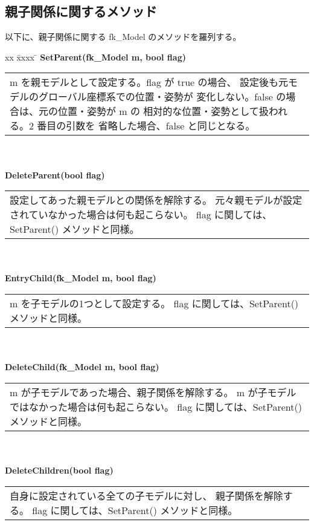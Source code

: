 \subsection{親子関係に関するメソッド} 
以下に、親子関係に関する fk\_Model のメソッドを羅列する。
\begin{tabbing}
xx \= xxxx \= \kill
\> \textbf{SetParent(fk\_Model m, bool flag)} \\
	\> \> \begin{tabular}{p{15cm}}
		m を親モデルとして設定する。flag が true の場合、
		設定後も元モデルのグローバル座標系での位置・姿勢が
		変化しない。false の場合は、元の位置・姿勢が m の
		相対的な位置・姿勢として扱われる。2 番目の引数を
		省略した場合、false と同じとなる。
	\end{tabular} \\ \\

\> \textbf{DeleteParent(bool flag)} \\
	\> \> \begin{tabular}{p{15cm}}
		設定してあった親モデルとの関係を解除する。
		元々親モデルが設定されていなかった場合は何も起こらない。
		flag に関しては、SetParent() メソッドと同様。
	\end{tabular} \\ \\

\> \textbf{EntryChild(fk\_Model m, bool flag)} \\
	\> \> \begin{tabular}{p{15cm}}
		m を子モデルの1つとして設定する。
		flag に関しては、SetParent() メソッドと同様。
	\end{tabular} \\ \\

\> \textbf{DeleteChild(fk\_Model m, bool flag)} \\
	\> \> \begin{tabular}{p{15cm}}
		m が子モデルであった場合、親子関係を解除する。
		m が子モデルではなかった場合は何も起こらない。
		flag に関しては、SetParent() メソッドと同様。
	\end{tabular} \\ \\

\> \textbf{DeleteChildren(bool flag)} \\
	\> \> \begin{tabular}{p{15cm}}
		自身に設定されている全ての子モデルに対し、
		親子関係を解除する。
		flag に関しては、SetParent() メソッドと同様。
	\end{tabular} \\ \\

\end{tabbing}

